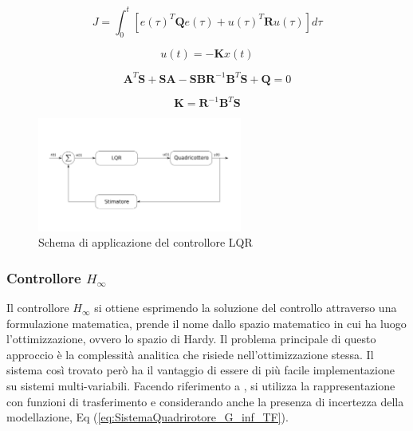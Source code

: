 \begin{equation}\label{eq:SistemaQuadrirotore_LQRCosto}
	J = \int_{0}^{t} \left[e(\tau)^T \mathbf{Q} e(\tau) + u(\tau)^T \mathbf{R} u(\tau)\right] d \tau
\end{equation}

\begin{equation}\label{eq:SistemaQuadrirotore_K_LQR}
	u(t) = -\mathbf{K} x(t)
\end{equation}

\begin{equation}\label{eq:SistemaQuadrirotore_Ricatti}
	\mathbf{A}^T \mathbf{S} + \mathbf{S} \mathbf{A} - \mathbf{S} \mathbf{B} \mathbf{R}^{-1} \mathbf{B}^T \mathbf{S} + \mathbf{Q} = 0
\end{equation}

\begin{equation}\label{eq:SistemaQuadrirotore_Ricatti_sol}
	\mathbf{K} = \mathbf{R}^{-1}  \mathbf{B}^T \mathbf{S}
\end{equation}

\begin{figure}
	\centering
	\includegraphics[width=0.6\textwidth]{SistemaQuadrirotore/Figure/LQR}
	\caption{Schema di applicazione del controllore LQR}
\end{figure}
 

\subsubsection{Controllore $H_\infty$}

Il controllore $H_\infty$ si ottiene esprimendo la soluzione del controllo attraverso una formulazione matematica, prende il nome dallo spazio matematico in cui ha luogo l'ottimizzazione, ovvero lo spazio di Hardy. Il problema principale di questo approccio è la complessità analitica che risiede nell'ottimizzazione stessa. Il sistema così trovato però ha il vantaggio di essere di più facile implementazione su sistemi multi-variabili. Facendo riferimento a \cite{GrimbleM.J1991Hrcd}, si utilizza la rappresentazione con funzioni di trasferimento e considerando anche la presenza di incertezza della modellazione, Eq (\ref{eq:SistemaQuadrirotore_G_inf_TF}).

